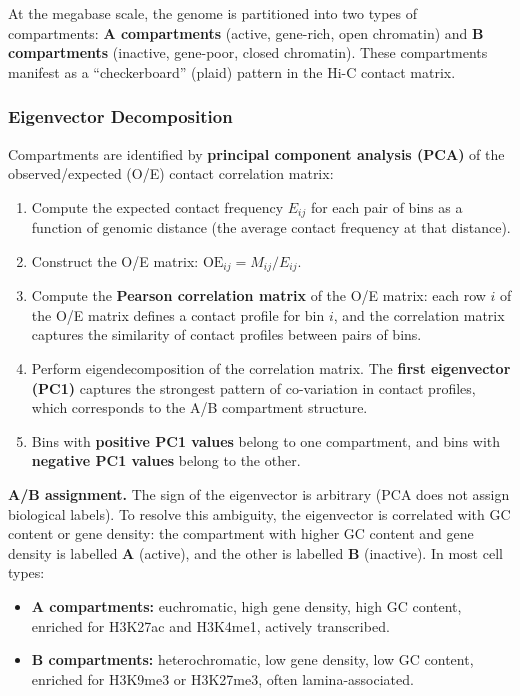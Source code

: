 At the megabase scale, the genome is partitioned into two types of compartments: \textbf{A compartments} (active, gene-rich, open chromatin) and \textbf{B compartments} (inactive, gene-poor, closed chromatin). These compartments manifest as a ``checkerboard'' (plaid) pattern in the Hi-C contact matrix.

\subsubsection{Eigenvector Decomposition}
\label{subsubsec:3dgenome:eigenvector}

Compartments are identified by \textbf{principal component analysis (PCA)} of the observed/expected (O/E) contact correlation matrix:

\begin{enumerate}[itemsep=2pt]
  \item Compute the expected contact frequency $E_{ij}$ for each pair of bins as a function of genomic distance (the average contact frequency at that distance).
  \item Construct the O/E matrix: $\text{OE}_{ij} = M_{ij} / E_{ij}$.
  \item Compute the \textbf{Pearson correlation matrix} of the O/E matrix: each row $i$ of the O/E matrix defines a contact profile for bin $i$, and the correlation matrix captures the similarity of contact profiles between pairs of bins.
  \item Perform eigendecomposition of the correlation matrix. The \textbf{first eigenvector (PC1)} captures the strongest pattern of co-variation in contact profiles, which corresponds to the A/B compartment structure.
  \item Bins with \textbf{positive PC1 values} belong to one compartment, and bins with \textbf{negative PC1 values} belong to the other.
\end{enumerate}

\textbf{A/B assignment.} The sign of the eigenvector is arbitrary (PCA does not assign biological labels). To resolve this ambiguity, the eigenvector is correlated with GC content or gene density: the compartment with higher GC content and gene density is labelled \textbf{A} (active), and the other is labelled \textbf{B} (inactive). In most cell types:
\begin{itemize}[itemsep=2pt]
  \item \textbf{A compartments:} euchromatic, high gene density, high GC content, enriched for H3K27ac and H3K4me1, actively transcribed.
  \item \textbf{B compartments:} heterochromatic, low gene density, low GC content, enriched for H3K9me3 or H3K27me3, often lamina-associated.
\end{itemize}

